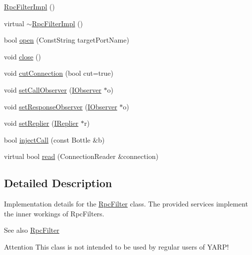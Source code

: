 \begin{DoxyCompactItemize}
\item 
\hyperlink{classyarp_1_1os_1_1impl_1_1_rpc_filter_impl_a542f5e2eed695cf4d8435d4426113c8b}{RpcFilterImpl} ()
\item 
virtual \hyperlink{classyarp_1_1os_1_1impl_1_1_rpc_filter_impl_a2d71b3e5d746ff637419ee48fa8f2d3e}{$\sim$RpcFilterImpl} ()
\item 
bool \hyperlink{classyarp_1_1os_1_1impl_1_1_rpc_filter_impl_a430fa4ad4d3f633a1e9b91f3ad0a0df4}{open} (ConstString targetPortName)
\item 
void \hyperlink{classyarp_1_1os_1_1impl_1_1_rpc_filter_impl_af8bff36f13d6f2a7460e5e4fd894cd9e}{close} ()
\item 
void \hyperlink{classyarp_1_1os_1_1impl_1_1_rpc_filter_impl_ae5de0a409d788cb9f1c910adb586c32c}{cutConnection} (bool cut=true)
\item 
void \hyperlink{classyarp_1_1os_1_1impl_1_1_rpc_filter_impl_a2d719a7c593fd21b8a7c4225c66a0234}{setCallObserver} (\hyperlink{classyarp_1_1os_1_1_i_observer}{IObserver} $\ast$o)
\item 
void \hyperlink{classyarp_1_1os_1_1impl_1_1_rpc_filter_impl_a7ab74acd4a4e69fce8fed0d54741bdc2}{setResponseObserver} (\hyperlink{classyarp_1_1os_1_1_i_observer}{IObserver} $\ast$o)
\item 
void \hyperlink{classyarp_1_1os_1_1impl_1_1_rpc_filter_impl_aecdd28fdc2cefb6e387b10aeeae47a2d}{setReplier} (\hyperlink{classyarp_1_1os_1_1_i_replier}{IReplier} $\ast$r)
\item 
bool \hyperlink{classyarp_1_1os_1_1impl_1_1_rpc_filter_impl_a289b662c96ec6189b0ed385ff4f135cf}{injectCall} (const Bottle \&b)
\item 
virtual bool \hyperlink{classyarp_1_1os_1_1impl_1_1_rpc_filter_impl_a58d85a00cf2de35238822d7674d98cf1}{read} (ConnectionReader \&connection)
\end{DoxyCompactItemize}


\subsection{Detailed Description}
Implementation details for the {\ttfamily \hyperlink{classyarp_1_1os_1_1_rpc_filter}{RpcFilter}} class. The provided services implement the inner workings of RpcFilters.

\begin{DoxySeeAlso}{See also}
\hyperlink{classyarp_1_1os_1_1_rpc_filter}{RpcFilter}
\end{DoxySeeAlso}
\begin{DoxyAttention}{Attention}
This class is not intended to be used by regular users of YARP! 
\end{DoxyAttention}


